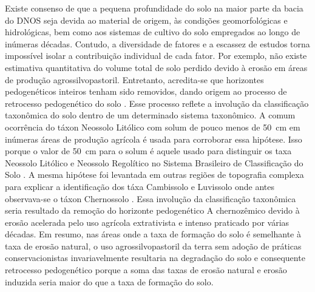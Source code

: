 Existe consenso de que a pequena profundidade do solo na maior parte da bacia do DNOS seja devida ao material 
de origem, às condições geomorfológicas e hidrológicas, bem como aos sistemas de cultivo do solo empregados ao 
longo de inúmeras décadas. Contudo, a diversidade de fatores e a escassez de estudos torna impossível isolar a 
contribuição individual de cada fator. Por exemplo, não existe estimativa quantitativa do volume total de solo 
perdido devido à erosão em áreas de produção agrossilvopastoril. Entretanto, acredita-se que horizontes 
pedogenéticos inteiros tenham sido removidos, dando origem ao processo de retrocesso pedogenético do solo
\cite{SamuelRosaEtAl2011a}. Esse processo reflete a involução da classificação taxonômica do solo dentro de um 
determinado sistema taxonômico. A comum ocorrência do táxon Neossolo Litólico com solum de pouco menos de 
\SI{50}{\cm} em inúmeras áreas de produção agrícola é usada para corroborar essa hipótese. Isso porque o valor 
de \SI{50}{\cm} para o solum é aquele usado para distinguir os taxa Neossolo Litólico e Neossolo Regolítico no 
Sistema Brasileiro de Classificação do Solo \cite{SantosEtAl2013a}. A mesma hipótese foi levantada em outras 
regiões de topografia complexa para explicar a identificação dos táxa Cambissolo e Luvissolo onde antes 
observava-se o táxon Chernossolo \cite{StreckEtAl2008}. Essa involução da classificação taxonômica seria 
resultado da remoção do horizonte pedogenético A chernozêmico devido à erosão acelerada pelo uso agrícola 
extrativista e intenso praticado por várias décadas. Em resumo, nas áreas onde a taxa de formação do solo é 
semelhante à taxa de erosão natural, o uso agrossilvopastoril da terra sem adoção de práticas 
conservacionistas invariavelmente resultaria na degradação do solo e consequente retrocesso pedogenético 
porque a soma das taxas de erosão natural e erosão induzida seria maior do que a taxa de formação do solo.

